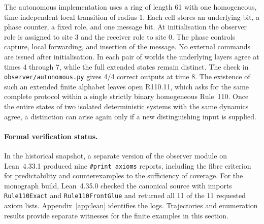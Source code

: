 The autonomous implementation uses a ring of length 61 with one homogeneous, time-independent local transition of radius 1. Each cell stores an underlying bit, a phase counter, a fixed role, and one message bit. At initialisation the observer role is assigned to site 3 and the receiver role to site 0. The phase controls capture, local forwarding, and insertion of the message. No external commands are issued after initialisation. In each pair of worlds the underlying layers agree at times 4 through 7, while the full extended states remain distinct. The check in \nolinkurl{observer/autonomous.py} gives 4/4 correct outputs at time 8. The existence of such an extended finite alphabet leaves open R110.11, which asks for the same complete protocol within a single strictly binary homogeneous Rule~110. Once the entire states of two isolated deterministic systems with the same dynamics agree, a distinction can arise again only if a new distinguishing input is supplied.

\paragraph{Formal verification status.}
In the historical snapshot, a separate version of the observer module on Lean~4.33.1 produced nine \texttt{\#print axioms} reports, including the fibre criterion for predictability and counterexamples to the sufficiency of coverage. For the monograph build, Lean~4.35.0 checked the canonical source with imports \texttt{Rule110Exact} and \texttt{Rule110FrontGlue} and returned all 11 of the 11 requested axiom lists. Appendix~\ref{app:lean} identifies the logs. Trajectories and enumeration results provide separate witnesses for the finite examples in this section.
